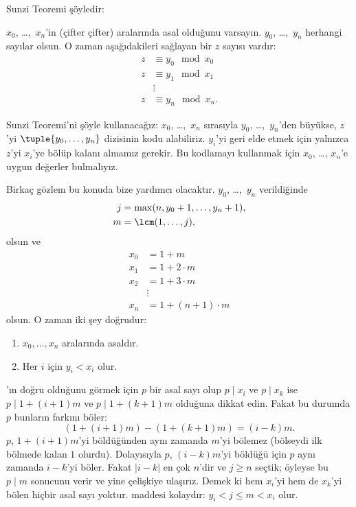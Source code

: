 \documentclass[../../../include/open-logic-section]{subfiles}
\begin{document}
Sunzi Teoremi şöyledir:
\begin{thm}
$x_0$, \dots,~$x_n$'in (çifter çifter) aralarında asal olduğunu varsayın.
$y_0$, \dots,~$y_n$ herhangi sayılar olsun. O zaman aşağıdakileri sağlayan
bir $z$ sayısı vardır:
\begin{align*}
z & \equiv y_0 \mod x_0 \\
z & \equiv y_1 \mod x_1 \\
& \vdots  \\
z & \equiv y_n \mod x_n.
\end{align*}
\end{thm}

Sunzi Teoremi'ni şöyle kullanacağız: $x_0$, \dots,~$x_n$ sırasıyla
$y_0$, \dots,~$y_n$'den büyükse, $z$'yi $\tuple{y_0,\dots,y_n}$ dizisinin
kodu alabiliriz. $y_i$'yi geri elde etmek için yalnızca $z$'yi $x_i$'ye
bölüp kalanı almamız gerekir. Bu kodlamayı kullanmak için $x_0$, \dots,
$x_n$'e uygun değerler bulmalıyız.

Birkaç gözlem bu konuda bize yardımcı olacaktır. $y_0$, \dots,~$y_n$
verildiğinde
\begin{align*}
j &= \max(n, y_0 + 1, \dots, y_n + 1), \\
m &= \lcm(1,\dots,j),
\end{align*}
olsun ve
\begin{align*}
x_0 & = 1 + m \\
x_1 & = 1 + 2 \cdot m \\
x_2 & = 1 + 3 \cdot m \\
& \vdots  \\
x_n & = 1 + (n+1) \cdot m
\end{align*}
olsun. O zaman iki şey doğrudur:
\begin{enumerate}
\item{} $x_0,\dots,x_n$ aralarında asaldır.
\item{} Her $i$ için $y_i<x_i$ olur.
\end{enumerate}
'ın doğru olduğunu görmek için $p$ bir asal sayı olup
$p\mid x_i$ ve $p\mid x_k$ ise $p\mid 1+(i+1)m$ ve
$p\mid 1+(k+1)m$ olduğuna dikkat edin. Fakat bu durumda $p$ bunların
farkını böler:
\[
(1 + (i+1)m) - (1+ (k+1)m) = (i-k) m.
\]
$p$, $1+(i+1)m$'yi böldüğünden aynı zamanda $m$'yi bölemez (bölseydi ilk
bölmede kalan $1$ olurdu). Dolayısıyla $p$, $(i-k)m$'yi böldüğü için
$p$ aynı zamanda $i-k$'yi böler. Fakat $\left|i-k\right|$ en çok $n$'dir ve $j\geq n$
seçtik; öyleyse bu $p\mid m$ sonucunu verir ve yine çelişkiye ulaşırız.
Demek ki hem $x_i$'yi hem de $x_k$'yi bölen hiçbir asal sayı yoktur.
 maddesi kolaydır: $y_i<j\leq m<x_i$ olur.
\end{document}
